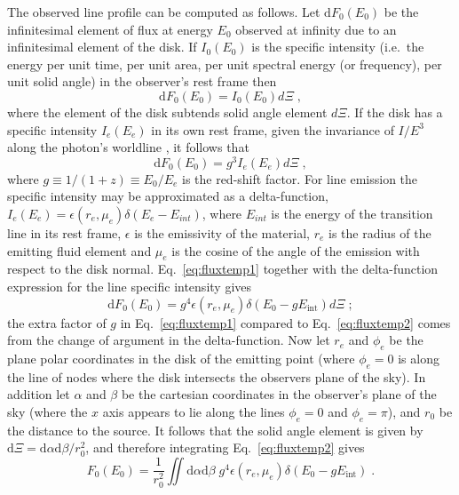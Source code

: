 The observed line profile can be computed as follows. Let $\textrm{d}F_{0}(E_{0})$ be the infinitesimal element of flux at energy $E_{0}$ observed at infinity due to an infinitesimal element of the disk. If $I_{0}(E_{0})$ is the specific intensity (i.e.\ the energy per unit time, per unit area, per unit spectral energy (or frequency), per unit solid angle) in the observer's rest frame then
\begin{equation} \textrm{d}F_{0}(E_{0})=I_{0}(E_{0})d\Xi \; ,\end{equation}
where the element of the disk subtends solid angle element $d\Xi$. If the disk has a specific intensity $I_{e}(E_{e})$ in its own rest frame, given the invariance of $I/E ^{3}$ along the photon's worldline \citep{MTW}, it follows that
\begin{equation}\label{eq:fluxtemp1} \textrm{d}F_{0}(E_{0})=g^{3}I_{e}(E_{e})d\Xi \; , \end{equation}
where $g\equiv1/(1+z)\equiv E_{0}/E_{e}$ is the red-shift factor. For line emission the specific intensity may be approximated as a delta-function, $I_{e}(E_{e})=\epsilon (r_{e},\mu_{e})\delta (E_{e}-E_{int})$, where $E_{int}$ is the energy of the transition line in its rest frame, $\epsilon$ is the emissivity of the material, $r_{e}$ is the radius of the emitting fluid element and $\mu_{e}$ is the cosine of the angle of the emission with respect to the disk normal. Eq.\ \ref{eq:fluxtemp1} together with the delta-function expression for the line specific intensity gives
\begin{equation}\label{eq:fluxtemp2} \textrm{d}F_{0}(E_{0})=g^{4}\epsilon(r_{e},\mu_{e})\delta(E_{0}-gE_{\textrm{int}})d\Xi \; ; \end{equation}
the extra factor of $g$ in Eq.\ \ref{eq:fluxtemp1} compared to Eq.\ \ref{eq:fluxtemp2} comes from the change of argument in the delta-function. Now let $r_{e}$ and $\phi_{e}$ be the plane polar coordinates in the disk of the emitting point (where $\phi_{e}=0$ is along the line of nodes where the disk intersects the observers plane of the sky). In addition let $\alpha$ and $\beta$ be the cartesian coordinates in the observer's plane of the sky (where the $x$ axis appears to lie along the lines $\phi_{e}=0$ and $\phi_{e}=\pi$), and $r_{0}$ be the distance to the source. It follows that the solid angle element is given by $\textrm{d}\Xi = \textrm{d}\alpha \textrm{d}\beta / r_{0}^{2}$, and therefore integrating Eq.\ \ref{eq:fluxtemp2} gives
\begin{equation}\label{eq:fluxtemp3} F_{0}(E_{0})=\frac{1}{r_{0}^{2}} \iint\textrm{d}\alpha \textrm{d}\beta\; g^{4}\epsilon(r_{e},\mu_{e})\delta(E_{0}-gE_{\textrm{int}}) \; . \end{equation}
